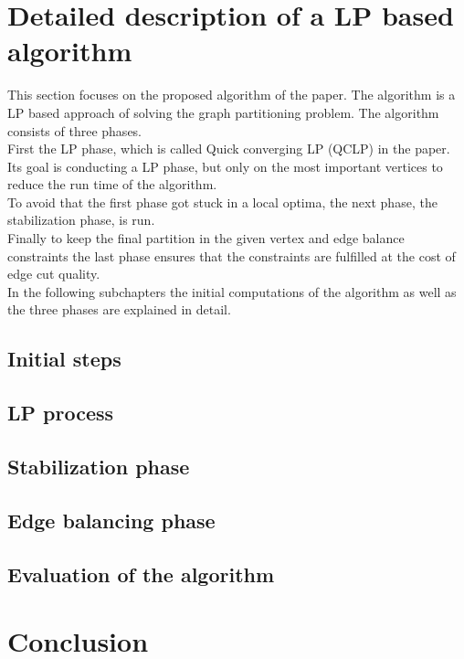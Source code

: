 \documentclass[acmsmall,nonacm,screen,review]{acmart}
\begin{document}
\section{Detailed description of a LP based algorithm}
This section focuses on the proposed algorithm of the paper. The algorithm is a LP based approach of solving the graph partitioning problem. The algorithm consists of three phases.\\
First the LP phase, which is called Quick converging LP (QCLP) in the paper. Its goal is conducting a LP phase, but only on the most important vertices to reduce the run time of the algorithm.\\
To avoid that the first phase got stuck in a local optima, the next phase, the stabilization phase, is run.\\
Finally to keep the final partition in the given vertex and edge balance constraints the last phase ensures that the constraints are fulfilled at the cost of edge cut quality.\\
In the following subchapters the initial computations of the algorithm as well as the three phases are explained in detail.
\subsection{Initial steps}
\subsection{LP process}
\subsection{Stabilization phase}
\subsection{Edge balancing phase}
\subsection{Evaluation of the algorithm}
\section{Conclusion}


\end{document}
